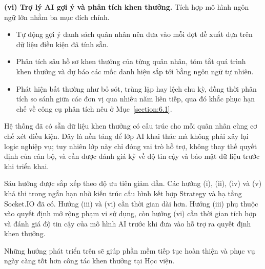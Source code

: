 \documentclass[../DoAn.tex]{subfiles}
\begin{document}
\textbf{(vi) Trợ lý AI gợi ý và phân tích khen thưởng.} Tích hợp mô hình ngôn ngữ lớn nhằm ba mục đích chính.
\begin{itemize}
    \item Tự động gợi ý danh sách quân nhân nên đưa vào mỗi đợt đề xuất dựa trên dữ liệu điều kiện đã tính sẵn.
    \item Phân tích sâu hồ sơ khen thưởng của từng quân nhân, tóm tắt quá trình khen thưởng và dự báo các mốc danh hiệu sắp tới bằng ngôn ngữ tự nhiên.
    \item Phát hiện bất thường như bỏ sót, trùng lặp hay lệch chu kỳ, đồng thời phân tích so sánh giữa các đơn vị qua nhiều năm liên tiếp, qua đó khắc phục hạn chế về công cụ phân tích nêu ở Mục~\ref{section:6.1}.
\end{itemize}
Hệ thống đã có sẵn dữ liệu khen thưởng có cấu trúc cho mỗi quân nhân cùng cơ chế xét điều kiện.
Đây là nền tảng để lớp AI khai thác mà không phải xây lại logic nghiệp vụ; tuy nhiên lớp này chỉ đóng vai trò hỗ trợ, không thay thế quyết định của cán bộ, và cần được đánh giá kỹ về độ tin cậy và bảo mật dữ liệu trước khi triển khai.

Sáu hướng được sắp xếp theo độ ưu tiên giảm dần.
Các hướng (i), (ii), (iv) và (v) khả thi trong ngắn hạn nhờ kiến trúc cấu hình kết hợp Strategy và hạ tầng Socket.IO đã có.
Hướng (iii) và (vi) cần thời gian dài hơn.
Hướng (iii) phụ thuộc vào quyết định mở rộng phạm vi sử dụng, còn hướng (vi) cần thời gian tích hợp và đánh giá độ tin cậy của mô hình AI trước khi đưa vào hỗ trợ ra quyết định khen thưởng.

Những hướng phát triển trên sẽ giúp phần mềm tiếp tục hoàn thiện và phục vụ ngày càng tốt hơn công tác khen thưởng tại Học viện.
\end{document}
